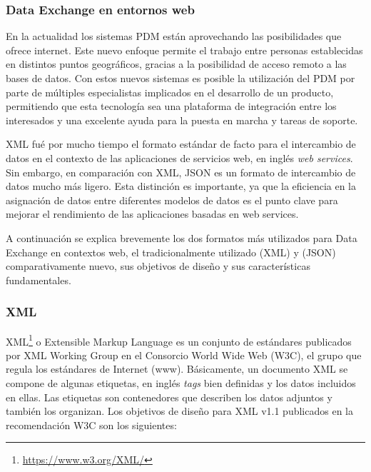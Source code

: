 \subsubsection{Data Exchange en entornos web}

En la actualidad los sistemas PDM están aprovechando las posibilidades que ofrece internet. Este nuevo enfoque permite el trabajo entre personas establecidas en distintos puntos geográficos, gracias a la posibilidad de acceso remoto a las bases de datos. 
Con estos nuevos sistemas es posible la utilización del PDM por parte de múltiples especialistas implicados en el desarrollo de un producto, permitiendo que esta tecnología sea una plataforma de integración entre los interesados y una excelente ayuda para la puesta en marcha y tareas de soporte.

XML fué por mucho tiempo el formato estándar de facto para el intercambio de datos en el contexto de las aplicaciones de servicios web, en inglés \textit{web services}. Sin embargo, en comparación con XML, JSON es un formato de intercambio de datos mucho más ligero. Esta distinción es importante, ya que la eficiencia en la asignación de datos entre diferentes modelos de datos es el punto clave para mejorar el rendimiento de las aplicaciones basadas en web services. \citep{Zunke2014}

A continuación se explica brevemente los dos formatos más utilizados para Data Exchange en contextos web, el tradicionalmente utilizado (XML) y (JSON) comparativamente nuevo, sus objetivos de diseño y sus características fundamentales.

\subsubsection{XML}

XML\footnote{\url{https://www.w3.org/XML/}} o Extensible Markup Language es un conjunto de estándares publicados por XML Working Group en el Consorcio World Wide Web  (W3C), el grupo que regula los estándares de Internet (www). Básicamente, un documento XML se compone de algunas etiquetas, en inglés \textit{tags} bien definidas y los datos incluidos en ellas. Las etiquetas son contenedores que describen los datos adjuntos y también los organizan. Los objetivos de diseño para XML v1.1 publicados en la recomendación W3C son los siguientes:

